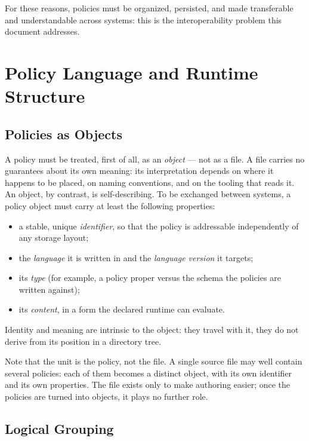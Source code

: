 \documentclass[11pt,a4paper]{article}
\newcommand{\term}[1]{\emph{#1}}                 %
\begin{document}
For these reasons, policies must be organized, persisted, and made
transferable and understandable across systems: this is the interoperability
problem this document addresses.

\section{Policy Language and Runtime Structure}

\subsection{Policies as Objects}

A policy must be treated, first of all, as an \term{object} --- not as a
file. A file carries no guarantees about its own meaning: its
interpretation depends on where it happens to be placed, on naming
conventions, and on the tooling that reads it. An object, by contrast, is
self-describing. To be exchanged between systems, a policy object must
carry at least the following properties:

\begin{itemize}[nosep]
  \item a stable, unique \term{identifier}, so that the policy is
        addressable independently of any storage layout;
  \item the \term{language} it is written in and the \term{language
        version} it targets;
  \item its \term{type} (for example, a policy proper versus the schema
        the policies are written against);
  \item its \term{content}, in a form the declared runtime can evaluate.
\end{itemize}

Identity and meaning are intrinsic to the object: they travel with it,
they do not derive from its position in a directory tree.

Note that the unit is the policy, not the file. A single source file may
well contain several policies: each of them becomes a distinct object,
with its own identifier and its own properties. The file exists only to
make authoring easier; once the policies are turned into objects, it
plays no further role.

\subsection{Logical Grouping}
\end{document}
